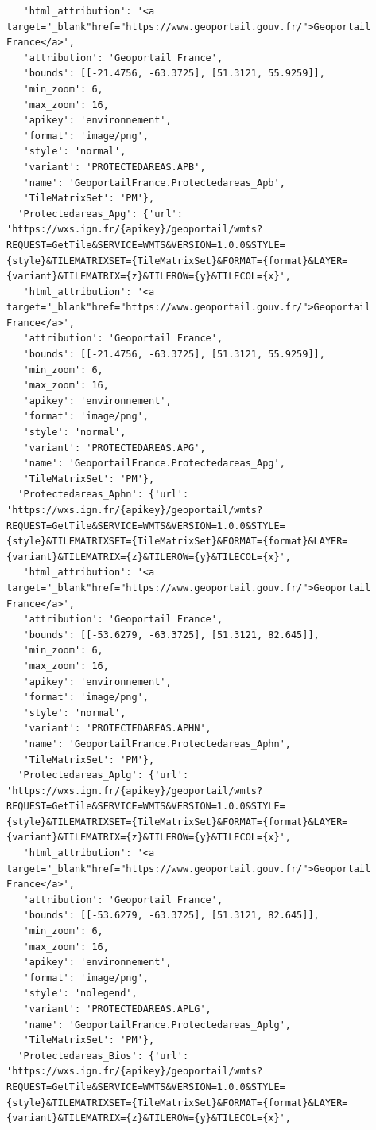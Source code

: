 \documentclass[
  letterpaper,
  DIV=11,
  numbers=noendperiod]{scrreprt}
\begin{document}
\begin{verbatim}
   'html_attribution': '<a target="_blank"href="https://www.geoportail.gouv.fr/">Geoportail France</a>',
   'attribution': 'Geoportail France',
   'bounds': [[-21.4756, -63.3725], [51.3121, 55.9259]],
   'min_zoom': 6,
   'max_zoom': 16,
   'apikey': 'environnement',
   'format': 'image/png',
   'style': 'normal',
   'variant': 'PROTECTEDAREAS.APB',
   'name': 'GeoportailFrance.Protectedareas_Apb',
   'TileMatrixSet': 'PM'},
  'Protectedareas_Apg': {'url': 'https://wxs.ign.fr/{apikey}/geoportail/wmts?REQUEST=GetTile&SERVICE=WMTS&VERSION=1.0.0&STYLE={style}&TILEMATRIXSET={TileMatrixSet}&FORMAT={format}&LAYER={variant}&TILEMATRIX={z}&TILEROW={y}&TILECOL={x}',
   'html_attribution': '<a target="_blank"href="https://www.geoportail.gouv.fr/">Geoportail France</a>',
   'attribution': 'Geoportail France',
   'bounds': [[-21.4756, -63.3725], [51.3121, 55.9259]],
   'min_zoom': 6,
   'max_zoom': 16,
   'apikey': 'environnement',
   'format': 'image/png',
   'style': 'normal',
   'variant': 'PROTECTEDAREAS.APG',
   'name': 'GeoportailFrance.Protectedareas_Apg',
   'TileMatrixSet': 'PM'},
  'Protectedareas_Aphn': {'url': 'https://wxs.ign.fr/{apikey}/geoportail/wmts?REQUEST=GetTile&SERVICE=WMTS&VERSION=1.0.0&STYLE={style}&TILEMATRIXSET={TileMatrixSet}&FORMAT={format}&LAYER={variant}&TILEMATRIX={z}&TILEROW={y}&TILECOL={x}',
   'html_attribution': '<a target="_blank"href="https://www.geoportail.gouv.fr/">Geoportail France</a>',
   'attribution': 'Geoportail France',
   'bounds': [[-53.6279, -63.3725], [51.3121, 82.645]],
   'min_zoom': 6,
   'max_zoom': 16,
   'apikey': 'environnement',
   'format': 'image/png',
   'style': 'normal',
   'variant': 'PROTECTEDAREAS.APHN',
   'name': 'GeoportailFrance.Protectedareas_Aphn',
   'TileMatrixSet': 'PM'},
  'Protectedareas_Aplg': {'url': 'https://wxs.ign.fr/{apikey}/geoportail/wmts?REQUEST=GetTile&SERVICE=WMTS&VERSION=1.0.0&STYLE={style}&TILEMATRIXSET={TileMatrixSet}&FORMAT={format}&LAYER={variant}&TILEMATRIX={z}&TILEROW={y}&TILECOL={x}',
   'html_attribution': '<a target="_blank"href="https://www.geoportail.gouv.fr/">Geoportail France</a>',
   'attribution': 'Geoportail France',
   'bounds': [[-53.6279, -63.3725], [51.3121, 82.645]],
   'min_zoom': 6,
   'max_zoom': 16,
   'apikey': 'environnement',
   'format': 'image/png',
   'style': 'nolegend',
   'variant': 'PROTECTEDAREAS.APLG',
   'name': 'GeoportailFrance.Protectedareas_Aplg',
   'TileMatrixSet': 'PM'},
  'Protectedareas_Bios': {'url': 'https://wxs.ign.fr/{apikey}/geoportail/wmts?REQUEST=GetTile&SERVICE=WMTS&VERSION=1.0.0&STYLE={style}&TILEMATRIXSET={TileMatrixSet}&FORMAT={format}&LAYER={variant}&TILEMATRIX={z}&TILEROW={y}&TILECOL={x}',

\end{verbatim}
\end{document}
